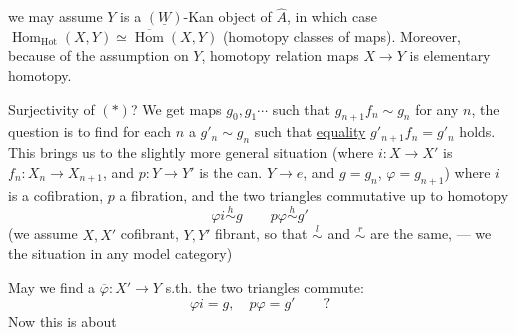 we may assume $Y$ is a $(\underline W)$-Kan object of $\widehat A$, in which case $\operatorname{Hom}_{\mathrm{Hot}}(X,Y)\simeq\overline{\operatorname{Hom}}(X,Y)$ (homotopy classes of maps). Moreover, because of the assumption on $Y$,  homotopy relation  maps $X\longrightarrow Y$ is   elementary homotopy.

Surjectivity of $(*)$? We get maps $g_0,g_1\cdots$
such that $g_{n+1}f_n\sim g_n$ for any $n$, the question is to find  for each $n$ a $g'_n\sim g_n$ such that \uline{equality} $g'_{n+1}f_n=g'_n$ holds. This brings us to the slightly more general situation (where $i:X\longrightarrow X'$ is $f_n:X_n\longrightarrow X_{n+1}$, and $p:Y\longrightarrow Y'$ is the can. $Y\longrightarrow e$, and $g=g_n$, $\varphi=g_{n+1}$)
where $i$ is a cofibration, $p$  a fibration, and the two triangles commutative up to homotopy
\[\varphi i\overset h\sim g\qquad p\varphi\overset h\sim g'\]
(we assume $X,X'$ cofibrant, $Y,Y'$ fibrant, so that $\overset l\sim$ and $\overset r\sim$ are the same, --- we  the situation in any model category)

May we find a $\overline\varphi:X'\longrightarrow Y$  s.th. the two triangles commute:
\[\varphi i=g,\quad p\varphi=g'\qquad?\]
\margin{$\overline\varphi\sim\varphi$,}
Now this is about


